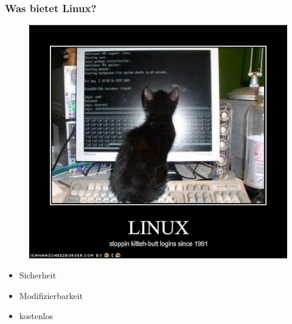 \begin{frame}
\frametitle{Was bietet Linux?}
\begin{figure}
\includegraphics[scale=0.33]{resources/kitteh.jpg}
\end{figure}
\begin{itemize}
	\item Sicherheit
	\item Modifizierbarkeit
	\item kostenlos
\end{itemize}
\end{frame}

